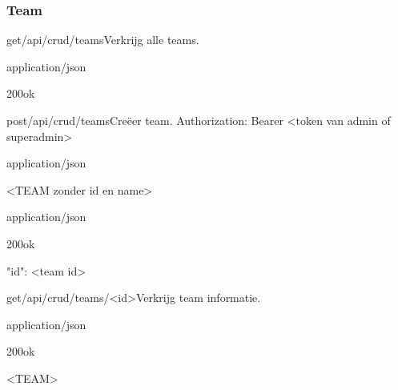\documentclass[10pt]{article}
\begin{document}
\subsubsection{Team}

\begin{apiRoute}{get}{/api/crud/teams}{Verkrijg alle teams.}
	\begin{routeResponse}{application/json}
		\begin{routeResponseItem}{200}{ok}
			\begin{routeResponseItemBody}
[
	<TEAM>, ...
]
\end{routeResponseItemBody}
		\end{routeResponseItem}
	\end{routeResponse}
\end{apiRoute}

\begin{apiRoute}{post}{/api/crud/teams}{Creëer team.}
 Authorization: Bearer <token van admin of superadmin>
	\begin{routeRequest}{application/json}
		\begin{routeRequestBody}
<TEAM zonder id en name>
		\end{routeRequestBody}
	\end{routeRequest}

	\begin{routeResponse}{application/json}
		\begin{routeResponseItem}{200}{ok}
			\begin{routeResponseItemBody}
{
	"id": <team id>
}
			\end{routeResponseItemBody}
		\end{routeResponseItem}
	\end{routeResponse}
\end{apiRoute}

\begin{apiRoute}{get}{/api/crud/teams/<id>}{Verkrijg team informatie.}
	\begin{routeParameter}
	\end{routeParameter}

	\begin{routeResponse}{application/json}
		\begin{routeResponseItem}{200}{ok}
			\begin{routeResponseItemBody}
<TEAM>
			\end{routeResponseItemBody}
		\end{routeResponseItem}
	\end{routeResponse}
\end{apiRoute}
\end{document}
